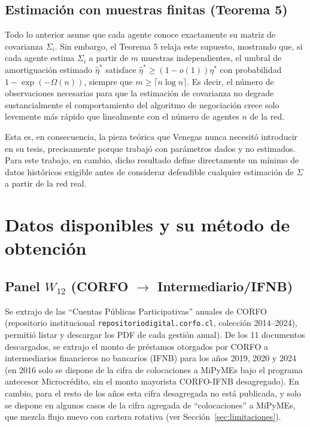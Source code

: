 \subsection{Estimación con muestras finitas (Teorema 5)}
\label{sec:teorema5}

Todo lo anterior asume que cada agente conoce exactamente su matriz de covarianza $\Sigma_i$. Sin embargo, el Teorema 5 relaja este supuesto, mostrando que, si cada agente estima $\Sigma_i$ a partir de $m$ muestras independientes, el umbral de amortiguación estimado $\hat\eta^*$ satisface $\hat\eta^* \geq (1-o(1))\eta^*$ con probabilidad $1-\exp(-\Omega(n))$, siempre que $m \geq \lceil n\log n \rceil$. Es decir, el número de observaciones necesarias para que la estimación de covarianza no degrade sustancialmente el comportamiento del algoritmo de negociación crece solo levemente más rápido que linealmente con el número de agentes $n$ de la red.

Esta es, en consecuencia, la pieza teórica que Venegas nunca necesitó introducir en su tesis, precisamente porque trabajó con parámetros dados y no estimados. Para este trabajo, en cambio, dicho resultado define directamente un mínimo de datos históricos exigible antes de considerar defendible cualquier estimación de $\Sigma$ a partir de la red real.

\section{Datos disponibles y su método de obtención}
\label{sec:datos}

\subsection[Panel W12 (CORFO a Intermediario/IFNB)]{Panel $W_{12}$ (CORFO $\to$ Intermediario/IFNB)}

Se extrajo de las ``Cuentas Públicas Participativas'' anuales de CORFO (repositorio institucional \texttt{repositoriodigital.corfo.cl}, colección 2014--2024), permitió listar y descargar los PDF de cada gestión anual). De los 11 documentos descargados, se extrajo el monto de préstamos otorgados por CORFO a intermediarios financieros no bancarios (IFNB) para los años 2019, 2020 y 2024 (en 2016 solo se dispone de la cifra de colocaciones a MiPyMEs bajo el programa antecesor Microcrédito, sin el monto mayorista CORFO-IFNB desagregado). En cambio, para el resto de los años esta cifra desagregada no está publicada, y solo se dispone en algunos casos de la cifra agregada de ``colocaciones'' a MiPyMEs, que mezcla flujo nuevo con cartera rotativa (ver Sección~\ref{sec:limitaciones}).

